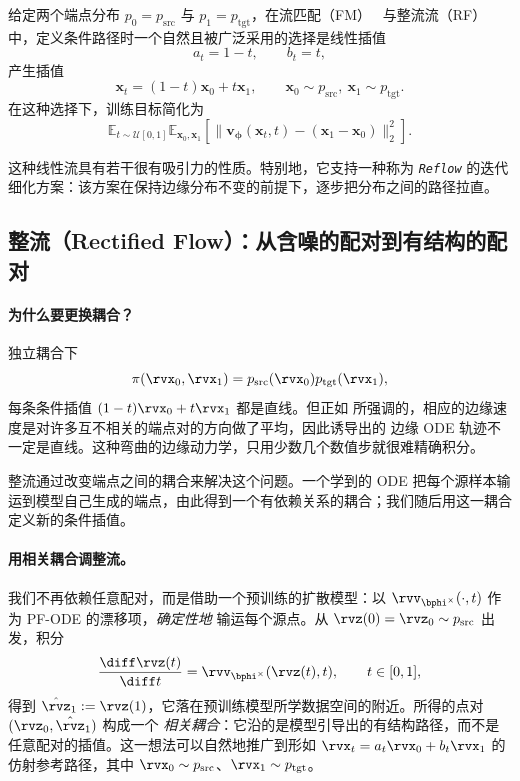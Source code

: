 给定两个端点分布 $p_0=p_{\mathrm{src}}$ 与 $p_1=p_{\mathrm{tgt}}$，在流匹配（FM）~\citep{lipman2022flow} 与整流流（RF）~\citep{liu2022flow} 中，定义条件路径时一个自然且被广泛采用的选择是线性插值
\[
a_t = 1 - t, \qquad b_t = t,
\]
产生插值
\[
\mathbf{x}_t = (1 - t)\mathbf{x}_0 + t \mathbf{x}_1,
\qquad \mathbf{x}_0 \sim p_{\mathrm{src}},\ \mathbf{x}_1 \sim p_{\mathrm{tgt}}.
\]
在这种选择下，训练目标简化为
\[
\mathbb{E}_{t \sim \mathcal{U}[0,1]}
\mathbb{E}_{\mathbf{x}_0, \mathbf{x}_1}
\left[ \bigl\|\mathbf{v}_{\bm{\phi}}(\mathbf{x}_t, t) - (\mathbf{x}_1 - \mathbf{x}_0)\bigr\|_2^2 \right].
\]

这种线性流具有若干很有吸引力的性质。特别地，它支持一种称为 \emph{\texttt{Reflow}} 的迭代细化方案：该方案在保持边缘分布不变的前提下，逐步把分布之间的路径拉直。


\subsection{整流（Rectified Flow）：从含噪的配对到有结构的配对}\label{subsec:rectify}

\paragraph{为什么要更换耦合？}
独立耦合下
\[
\pi(\rvx_0,\rvx_1)
=
p_{\mathrm{src}}(\rvx_0)
p_{\mathrm{tgt}}(\rvx_1),
\]
每条条件插值
$(1-t)\rvx_0+t\rvx_1$ 都是直线。但正如  所强调的，相应的边缘速度是对许多互不相关的端点对的方向做了平均，因此诱导出的
边缘 ODE 轨迹不一定是直线。这种弯曲的边缘动力学，只用少数几个数值步就很难精确积分。

整流通过改变端点之间的耦合来解决这个问题。一个学到的 ODE 把每个源样本输运到模型自己生成的端点，由此得到一个有依赖关系的耦合；我们随后用这一耦合定义新的条件插值。

\paragraph{用相关耦合调整流。}
我们不再依赖任意配对，而是借助一个预训练的扩散模型：以 $\rvv_{\bphi^\times}(\cdot,t)$ 作为 PF-ODE 的漂移项，\emph{确定性地} 输运每个源点。从 $\rvz(0)=\rvz_0 \sim p_{\text{src}}$ 出发，积分
\[
\frac{\diff \rvz(t)}{\diff t} = \rvv_{\bphi^\times}(\rvz(t),t), \qquad t \in [0,1],
\]
得到 $\hat\rvz_1 := \rvz(1)$，它落在预训练模型所学数据空间的附近。所得的点对 $(\rvz_0,\hat\rvz_1)$ 构成一个 \emph{相关耦合}：它沿的是模型引导出的有结构路径，而不是任意配对的插值。这一想法可以自然地推广到形如 $\rvx_t = a_t \rvx_0 + b_t \rvx_1$ 的仿射参考路径，其中 $\rvx_0 \sim p_{\text{src}}$、$\rvx_1 \sim p_{\text{tgt}}$。


